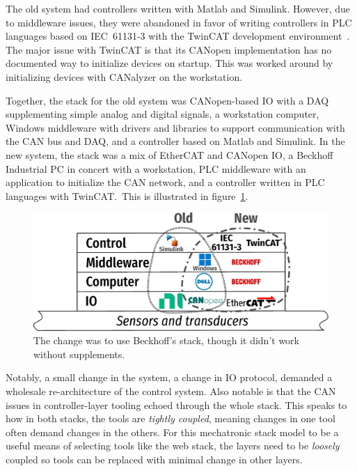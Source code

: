 \documentclass[english,12pt,a4paper,pdftex,eng,utf8]{aaltothesis}
\begin{document}
The old system had controllers written with Matlab and Simulink. However, due to middleware issues, they were abandoned in favor of writing controllers in PLC languages based on IEC~61131-3 with the TwinCAT development environment~\cite{IEC61131-3, BeckhoffTwinCAT}. The major issue with TwinCAT is that its CANopen implementation has no documented way to initialize devices on startup. This was worked around by initializing devices with CANalyzer on the workstation.

Together, the stack for the old system was CANopen-based IO with a DAQ supplementing simple analog and digital signals, a workstation computer, Windows middleware with drivers and libraries to support communication with the CAN bus and DAQ, and a controller based on Matlab and Simulink. In the new system, the stack was a mix of EtherCAT and CANopen IO, a Beckhoff Industrial PC in concert with a workstation, PLC middleware with an application to initialize the CAN network, and a controller written in PLC languages with TwinCAT.\ This is illustrated in figure~\ref{fig:mechatronic_tech_stack_dolores}.

\begin{figure}[t]
  \centering
  \includegraphics[width=\textwidth]{assets/mechatronic_tech_stack_dolores}
  \caption{The change was to use Beckhoff's stack, though it didn't work without supplements.}\label{fig:mechatronic_tech_stack_dolores}
\end{figure}

Notably, a small change in the system, a change in IO protocol, demanded a wholesale re-architecture of the control system. Also notable is that the CAN issues in controller-layer tooling echoed through the whole stack. This speaks to how in both stacks, the tools are \textit{tightly coupled}, meaning changes in one tool often demand changes in the others. For this mechatronic stack model to be a useful means of selecting tools like the web stack, the layers need to be \textit{loosely} coupled so tools can be replaced with minimal change in other layers.
\end{document}
